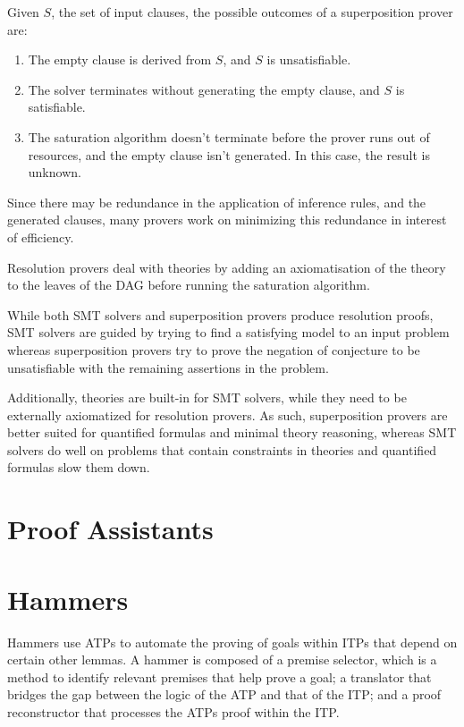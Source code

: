 \documentclass{article}
\begin{document}
	Given $S$, the set of input clauses, the possible 
	outcomes of a superposition prover are:
	\begin{enumerate}
		\item The empty clause is derived from $S$, and
		$S$ is unsatisfiable.
		\item The solver terminates without generating the 
		empty clause, and $S$ is satisfiable.
		\item The saturation algorithm doesn't terminate 
		before the prover runs out of resources, and 
		the empty clause isn't generated. In this 
		case, the result is unknown. 
	\end{enumerate}
	
	Since there may be redundance in the application 
	of inference rules, and the generated clauses, 
	many provers work on minimizing this redundance in 
	interest of efficiency.
	
	Resolution provers deal with theories by 
	adding an axiomatisation of the theory to the 
	leaves of the DAG before running the 
	saturation algorithm.
	
	While both SMT solvers and superposition provers 
	produce resolution proofs, SMT solvers are guided 
	by trying to find a satisfying model to an input 
	problem whereas superposition provers try 
	to prove the negation of conjecture to be unsatisfiable
	with the remaining assertions in the problem. 
	
	Additionally, theories are built-in for SMT solvers,
	while they need to be externally axiomatized for 
	resolution provers. As such, superposition provers
	are better suited for quantified formulas and 
	minimal theory reasoning, whereas SMT solvers 
	do well on problems that contain constraints 
	in theories and quantified formulas slow them 
	down.
	
\section{Proof Assistants}
\label{itp}
	
\section{Hammers}
\label{gen-hammers}
	Hammers use ATPs to automate the proving of goals within ITPs
	that depend on certain other lemmas. A hammer is composed of 
	a premise selector, which is a method to identify relevant 
	premises that help prove a goal; a translator that bridges 
	the gap between the logic of the ATP and that of the ITP; 
	and a proof reconstructor that processes the ATPs proof
	within the ITP.
	
\end{document}
